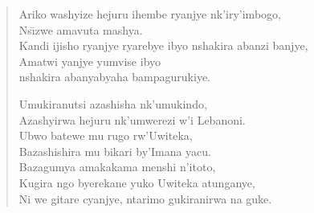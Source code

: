 \begin{frame}
    \begin{verse}
        Ariko washyize hejuru ihembe ryanjye nk'iry'imbogo, \\
        Ns{\=\i}zwe amavuta mashya. \\
        Kandi ijisho ryanjye ryarebye ibyo nshakira abanzi banjye, \\
        Amatwi yanjye yumvise ibyo \\
        nshakira abanyabyaha bampagurukiye.

        Umukiranutsi azashisha nk'umukindo, \\
        Azashyirwa hejuru nk'umwerezi w'i Lebanoni. \\
        Ubwo batewe mu rugo rw'Uwiteka, \\
        Bazashishira mu bikari by'Imana yacu. \\
        Bazagumya amakakama menshi n'itoto, \\
        Kugira ngo byerekane yuko Uwiteka atunganye, \\
        Ni we gitare cyanjye, ntarimo gukiranirwa na guke.
    \end{verse}
\end{frame}
\endinput
